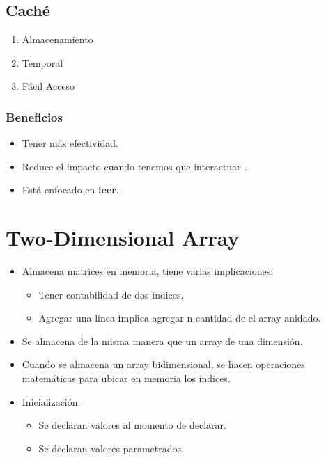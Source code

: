 \subsection{Caché}
\begin{enumerate}
    \item Almacenamiento 
    \item Temporal 
    \item Fácil Acceso
\end{enumerate}

\subsubsection{Beneficios}
\begin{itemize}
    \item Tener más efectividad.
    \item Reduce el impacto cuando tenemos que interactuar  .
    \item Está enfocado en \textbf{leer}.
\end{itemize}




\section{Two-Dimensional Array}
\begin{itemize}
    \item Almacena matrices en memoria, tiene varias implicaciones:
        \begin{itemize}
            \item Tener contabilidad de dos indices.
            \item Agregar una línea implica agregar n cantidad de el array anidado.
        \end{itemize}
    
    \item Se almacena de la misma manera que un array de una dimensión.
    \item Cuando se almacena un array bidimensional, se hacen operaciones matemáticas para ubicar en memoria los indices.
    \item Inicialización:
        \begin{itemize}
            \item Se declaran valores al momento de declarar.
            \item Se declaran valores parametrados.
        \end{itemize}
\end{itemize}


